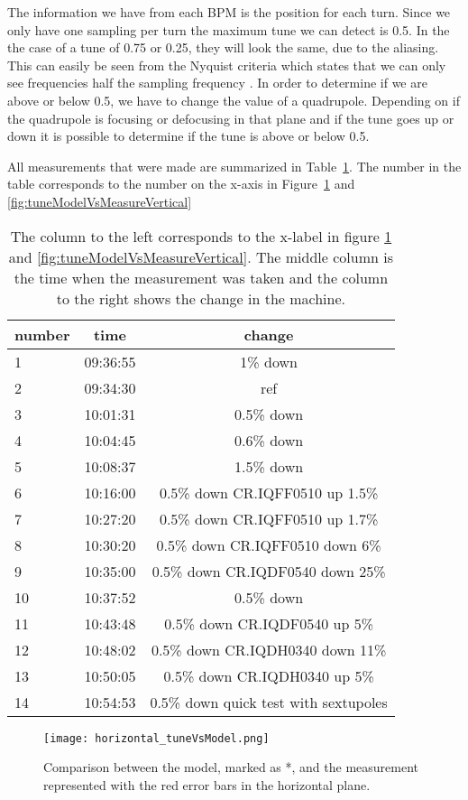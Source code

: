 The information we have from each BPM is the position for each turn. 
Since we only have one sampling per turn the maximum tune we can detect is 0.5. 
In the the case of a tune of 0.75 or 0.25, they will look the same, 
due to the aliasing. This can easily be seen from the Nyquist criteria 
which states that we can only see frequencies half the sampling frequency \cite{wiki:nyqvist}. 
In order to determine if we are above or below 0.5, 
we have to change the value of a quadrupole. 
Depending on if the quadrupole is focusing or 
defocusing in that plane and if the tune goes up or down it is possible to 
determine if the tune is above or below 0.5.  

All measurements that were made are summarized in Table~\ref{tab:tuneMeasureTime}. 
The number in the table corresponds to the number on the x-axis in 
Figure~\ref{fig:tuneModelVsMeasureHorizontal} and \ref{fig:tuneModelVsMeasureVertical}
\begin{table}[ht]
\centering
\begin{tabular}{| l | c | c |}
\hline
\textbf{number} & \textbf{time} & \textbf{change} \\ \hline
1 & 09:36:55 & 1\% down \\
2 & 09:34:30 & ref \\
3 & 10:01:31 & 0.5\% down \\
4 & 10:04:45 & 0.6\% down   \\
5 & 10:08:37 & 1.5\% down  \\
6 & 10:16:00 & 0.5\% down  CR.IQFF0510 up 1.5\% \\
7 & 10:27:20 & 0.5\% down  CR.IQFF0510 up 1.7\% \\
8 & 10:30:20 & 0.5\% down  CR.IQFF0510 down 6\% \\
9 & 10:35:00  & 0.5\% down  CR.IQDF0540 down 25\% \\
10 & 10:37:52 &  0.5\% down \\
11 & 10:43:48 &  0.5\% down  CR.IQDF0540 up 5\% \\
12 & 10:48:02 &  0.5\% down  CR.IQDH0340 down 11\% \\
13 & 10:50:05 &  0.5\% down  CR.IQDH0340 up 5\% \\
14 & 10:54:53 &  0.5\% down  quick test with sextupoles \\
\hline
\end{tabular}
\caption[Time and numbering of the tune measurement.]
{The column to the left corresponds to the x-label in 
figure \ref{fig:tuneModelVsMeasureHorizontal} and \ref{fig:tuneModelVsMeasureVertical}. 
The middle column is the time when the measurement was taken and 
the column to the right shows the change in the machine.  \label{tab:tuneMeasureTime}}
\end{table}
\begin{figure}[!h]
\centering
\texttt{[image: horizontal\_tuneVsModel.png]}
\caption[Comparison between the tune from the model and the measurement in the horizontal plane]
{Comparison between the model, marked as *, 
and the measurement represented with the red error bars in the horizontal plane. 
\label{fig:tuneModelVsMeasureHorizontal}}
\end{figure}
 
